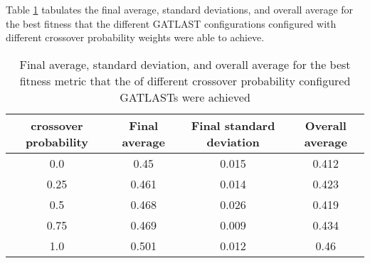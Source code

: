 Table \ref{tab:HP:GA:crossoverProp:best fitness} tabulates the final average, standard deviations, and overall average for the best fitness that the different GATLAST configurations configured with different crossover probability weights were able to achieve.
\begin{table}[tbh!]
\centering
\begin{adjustbox}{trim=0cm 0cm 0cm 0cm, clip=true}
\begin{tabular}{|c|c|c|c|}
\hline
crossover probability & Final average & Final standard deviation & Overall average\\
\hline
0.0 & 0.45 & 0.015 & 0.412\\\hline
0.25 & 0.461 & 0.014 & 0.423\\\hline
0.5 & 0.468 & 0.026 & 0.419\\\hline
0.75 & 0.469 & 0.009 & 0.434\\\hline
1.0 & 0.501 & 0.012 & 0.46\\\hline
\end{tabular}
\end{adjustbox}
\caption{Final average, standard deviation, and overall average for the best fitness metric that the of different crossover probability configured GATLASTs were achieved}
\label{tab:HP:GA:crossoverProp:best fitness}
\end{table}
